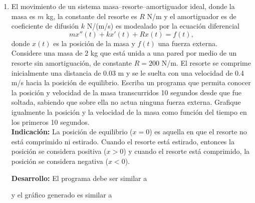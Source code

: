 \documentclass[letter,11pt]{article}
\begin{document}
\begin{enumerate}
\item El movimiento de un sistema masa--resorte--amortiguador ideal, donde la masa es $m$ kg, la constante del resorte es $R$ N/m y el amortiguador es de coeficiente de difusi\'on $k$ N/(m/s) es modealado por la ecuaci\'on diferencial
$$ mx''(t) + kx'(t) + Rx(t) = f(t), $$
donde $x(t)$ es la posici\'on de la masa y $f(t)$ una fuerza externa. \\
Considere una masa de 2 kg que est\'a unida a una pared por medio de un resorte sin amortiguaci\'on, de constante $R=200$ N/m. El resorte se comprime inicialmente una distancia de 0.03 m y se le suelta con una velocidad de 0.4 m/s hacia la posici\'on de equilibrio. Escriba un programa \octave que permita conocer la posici\'on y velocidad de la masa transcurridos 10 segundos desde que fue soltada, sabiendo que sobre ella no actua ninguna fuerza externa. Grafique igualmente la posici\'on y la velocidad de la masa como funci\'on del tiempo en los primeros 10 segundos. \\
\textbf{Indicaci\'on:} La posici\'on de equilibrio ($x=0$) es aquella en que el resorte no est\'a comprimido ni estirado. Cuando el resorte est\'a estirado, entonces la posici\'on se considera positiva ($x > 0$) y cuando el resorte est\'a comprimido, la posici\'on se considera negativa ($x < 0$).

\textbf{Desarrollo:} El programa debe ser similar a

\hfill{}
y el gr\'afico generado es similar a
\hfill{}


\end{enumerate}
\end{document}
